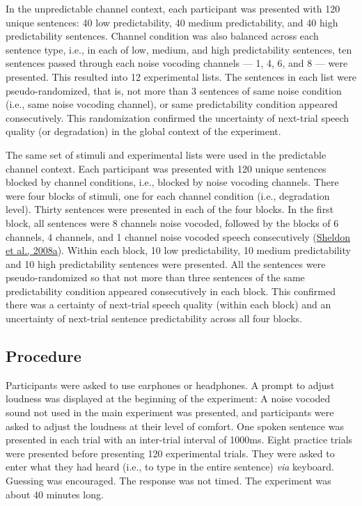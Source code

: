 \documentclass[a4paper, nobind]{templates/ociamthesis}
\begin{document}
In the unpredictable channel context, each participant was presented with 120 unique sentences: 40 low predictability, 40 medium predictability, and 40 high predictability sentences.
Channel condition was also balanced across each sentence type, i.e., in each of low, medium, and high predictability sentences, ten sentences passed through each noise vocoding channels --- 1, 4, 6, and 8 --- were presented.
This resulted into 12 experimental lists.
The sentences in each list were pseudo-randomized, that is, not more than 3 sentences of same noise condition (i.e., same noise vocoding channel), or same predictability condition appeared consecutively.
This randomization confirmed the uncertainty of next-trial speech quality (or degradation) in the global context of the experiment.

The same set of stimuli and experimental lists were used in the predictable channel context.
Each participant was presented with 120 unique sentences blocked by channel conditions, i.e., blocked by noise vocoding channels.
There were four blocks of stimuli, one for each channel condition (i.e., degradation level).
Thirty sentences were presented in each of the four blocks.
In the first block, all sentences were 8 channels noise vocoded, followed by the blocks of 6 channels, 4 channels, and 1 channel noise vocoded speech consecutively (\protect\hyperlink{ref-Sheldon2008a}{Sheldon et al., 2008a}).
Within each block, 10 low predictability, 10 medium predictability and 10 high predictability sentences were presented.
All the sentences were pseudo-randomized so that not more than three sentences of the same predictability condition appeared consecutively in each block.
This confirmed there was a certainty of next-trial speech quality (within each block) and an uncertainty of next-trial sentence predictability across all four blocks.

\hypertarget{procedure-2}{%
\subsection{Procedure}\label{procedure-2}}

Participants were asked to use earphones or headphones.
A prompt to adjust loudness was displayed at the beginning of the experiment:
A noise vocoded sound not used in the main experiment was presented, and participants were asked to adjust the loudness at their level of comfort.
One spoken sentence was presented in each trial with an inter-trial interval of 1000ms.
Eight practice trials were presented before presenting 120 experimental trials.
They were asked to enter what they had heard (i.e., to type in the entire sentence) \emph{via} keyboard.
Guessing was encouraged.
The response was not timed.
The experiment was about 40 minutes long.
\end{document}
